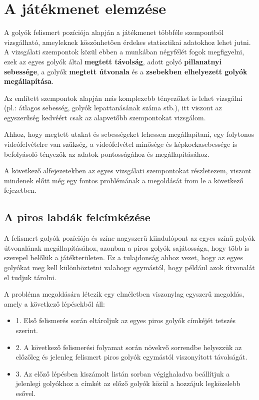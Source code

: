 \section{A játékmenet elemzése}
A golyók felismert pozíciója alapján a játékmenet többféle szempontból vizsgálható, ameyleknek köszönhetően érdekes statisztikai adatokhoz lehet jutni. A vizsgálati szempontok közül ebben a munkában négyfélét fogok megfigyelni, ezek az egyes golyók által \textbf{megtett távolság}, adott golyó \textbf{pillanatnyi sebessége}, a golyók \textbf{megtett útvonala} és a \textbf{zsebekben elhelyezett golyók megállapítása}.
\par Az említett szempontok alapján más komplexebb tényezőket is lehet vizsgálni (pl.: átlagos sebesség, golyók lepattanásának száma stb.), itt viszont az egyszerűség kedvéért csak az alapvetőbb szempontokat vizsgálom.
\par Ahhoz, hogy megtett utakat és sebességeket lehessen megállapítani, egy folytonos videófelvételre van szükség, a videófelvétel minősége és képkockasebessége is befolyásoló tényezők az adatok pontosságához és megállapításához.
\par A következő alfejezetekben az egyes vizsgálati szempontokat részletezem, viszont mindenek előtt még egy fontos problémának a megoldását írom le a következő fejezetben.

\subsection{A piros labdák felcímkézése}
\label{subsection:piros_labda_cimke}
A felismert golyók pozíciója és színe nagyszerű kiindulópont az egyes színű golyók útvonalának megállapításához, azonban a piros golyók sajátossága, hogy több is szerepel belőlük a játékterületen. Ez a tulajdonság ahhoz vezet, hogy az egyes golyókat meg kell különböztetni valahogy egymástól, hogy például azok útvonalát el tudjuk tárolni.
\par A probléma megoldására létezik egy elméletben viszonylag egyszerű megoldás, amely a következő lépésekből áll:

\begin{itemize}
    \item 1. Első felismerés során eltároljuk az egyes piros golyók címkéjét tetszés szerint.
    \item 2. A következő felismerési folyamat során növekvő sorrendbe helyezzük az előzőleg és jelenleg felismert piros golyók egymástól viszonyított távolságát.
    \item 3. Az előző lépésben kiszámolt listán sorban végighaladva beállítjuk a jelenlegi golyókhoz a címkét az előző golyók közül a hozzájuk legközelebb esővel.
\end{itemize}

